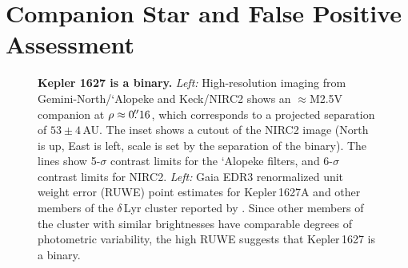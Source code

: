 \documentclass[12pt,modern,twocolumn,tighten]{aastex63}
\begin{document}
\section{Companion Star and False Positive Assessment}
\label{app:companionstar}

\begin{figure}[tp]
	\begin{center}
		\leavevmode
	\end{center}
	\vspace{-0.5cm}
	\caption{
    {\bf Kepler 1627 is a binary.} {\it Left:} High-resolution imaging
    from Gemini-North/`Alopeke and Keck/NIRC2 shows an $\approx$M2.5V
    companion at $\rho \approx 0\mbox{$.\!\!^{\prime\prime}$}16$, which corresponds to a
    projected separation of $53\pm4$\,AU.  The inset shows a cutout of
    the NIRC2 image (North is up, East is left, scale is set by the
    separation of the binary).  The lines show 5-$\sigma$ contrast
    limits for the `Alopeke filters, and 6-$\sigma$ contrast limits
    for NIRC2.  {\it Left:} Gaia EDR3 renormalized
    unit weight error (RUWE) point estimates for Kepler\,1627A and
    other members of the $\delta$\,Lyr cluster reported by
    \citet{KounkelCovey2019}.  Since other members of the cluster with
    similar brightnesses have comparable degrees of photometric
    variability, the high RUWE suggests that Kepler\,1627 is a
    binary. 
    \label{fig:kep1627binary}
	}
\end{figure}
\end{document}
